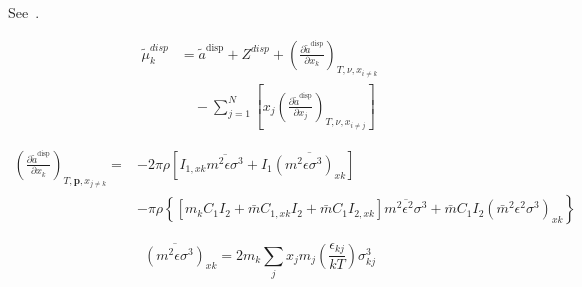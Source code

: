 \documentclass[12pt, letterpaper]{article}
\begin{document}
See~\cite{Gross2001}.

\begin{equation}
    \begin{aligned}
        \tilde{\mu}^{disp}_{k}
        &=\tilde{a}^{\mathrm{disp}} + Z^{disp}
        +\left(\frac{\partial\tilde{a}^{\mathrm{disp}}}{\partial x_{k}}\right)_{T,\nu,x_{i\neq k}}
        \\
        &\quad -\sum_{j=1}^{N}\left[x_{j}\left(\frac{\partial\tilde{a}^{\mathrm{disp}}}{\partial x_{j}}\right)_{T,\nu,x_{i\neq j}}\right]
    \end{aligned}
    \label{eq:mu_disp}
\end{equation}

\begin{equation}
    \begin{aligned}
        \left(\frac{\partial \tilde{a}^{\mathrm{disp}}}{\partial x_k}\right)_{T, \boldsymbol{p}, x_{j \neq k}}
        =& -2 \pi \rho\left[I_{1, x k} \overline{m^2 \epsilon \sigma^3}+I_1 \overline{\left(m^2 \epsilon \sigma^3\right)_{x k}}\right] \\
        &- \pi \rho\left\{\left[m_k C_1 I_2+\bar{m} C_{1, x k} I_2+\bar{m} C_1 I_{2, x k}\right] \overline{m^2 \epsilon^2 \sigma^3}+\right.
        \left.\bar{m} C_1 I_2\left(\bar{m}^2 \epsilon^2 \sigma^3\right)_{x k}\right\}
    \end{aligned}
\end{equation}


\begin{equation}
    \overline{(m^{2}\epsilon\sigma^{3})}_{xk}=2m_{k}\sum_{j}x_{j}m_{j}\left(\frac{\epsilon_{kj}}{kT}\right)\sigma_{kj}^{3}
    \label{eq:m2epssigma3_xk}
\end{equation}

\end{document}
